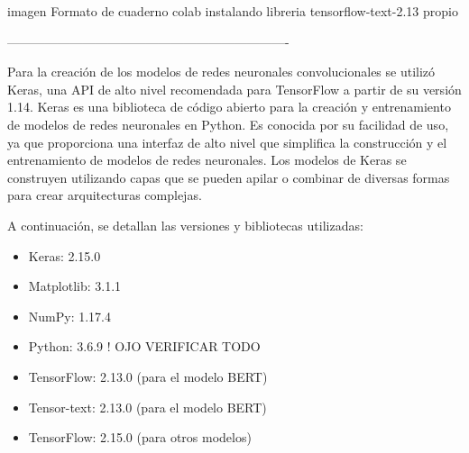 imagen Formato de cuaderno colab instalando 
libreria tensorflow-text-2.13 propio

-------------------------------------------------------------------

Para la creación de los modelos de redes neuronales convolucionales se utilizó Keras, una API de alto nivel recomendada para TensorFlow a partir de su versión 1.14. Keras es una biblioteca de código abierto para la creación y entrenamiento de modelos de redes neuronales en Python. Es conocida por su facilidad de uso, ya que proporciona una interfaz de alto nivel que simplifica la construcción y el entrenamiento de modelos de redes neuronales. Los modelos de Keras se construyen utilizando capas que se pueden apilar o combinar de diversas formas para crear arquitecturas complejas.

A continuación, se detallan las versiones y bibliotecas utilizadas:

\begin{itemize}

\item Keras: 2.15.0
\item Matplotlib: 3.1.1
\item NumPy: 1.17.4
\item Python: 3.6.9 ! OJO VERIFICAR TODO
\item TensorFlow: 2.13.0 (para el modelo BERT)
\item Tensor-text: 2.13.0 (para el modelo BERT)
\item TensorFlow: 2.15.0 (para otros modelos)

\end{itemize}